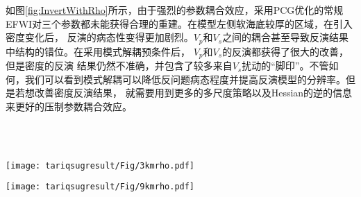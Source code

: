 如图\ref{fig:InvertWithRho}所示，由于强烈的参数耦合效应，采用PCG优化的常规EFWI对三个参数都未能获得合理的重建。在模型左侧软海底较厚的区域，在引入密度变化后，
反演的病态性变得更加剧烈。$V_p$和$V_s$之间的耦合甚至导致反演结果中结构的错位。在采用模式解耦预条件后， $V_p$和$V_s$的反演都获得了很大的改善，但是密度的反演
结果仍然不准确，并包含了较多来自$V_s$扰动的“脚印”。不管如何，我们可以看到模式解耦可以降低反问题病态程度并提高反演模型的分辨率。但是若想改善密度反演结果，
就需要用到更多的多尺度策略以及Hessian的逆的信息来更好的压制参数耦合效应。
\begin{figure*}
    \begin{center}
        \\
        \\
        \caption{Comparison between conventional and MD-based method with density
            variation: (a) - (c) are the inverted $V_p$, $V_s$ and $\rho$ with
            conventional method, (d) - (f) are the inverted $V_p$, $V_s$ and $\rho$
            with MD-based method. }
    \label{fig:InvertWithRho}
    \end{center}
\end{figure*} 
\begin{figure*}
    \begin{center}
        {\texttt{[image: tariqsugresult/Fig/3kmrho.pdf]}}
        \caption{
        The velocity and density profiles at 3.0 km (a, b)  with the true models
            (black),
            the initial models (blue), the PCG-based (yellow) and MD-based (green)
            inverted models.
    }
    \label{fig:RhoProfile3km}
    \end{center}
\end{figure*}
\begin{figure*}
    \begin{center}
        {\texttt{[image: tariqsugresult/Fig/9kmrho.pdf]}}
        \caption{
        The velocity and density profiles at 9.0 km (a, b)  with the true models
            (black),
            the initial models (blue), the PCG-based (yellow) and MD-based (green)
            inverted models.
    }
    \label{fig:RhoProfile9km}
    \end{center}
\end{figure*} 


